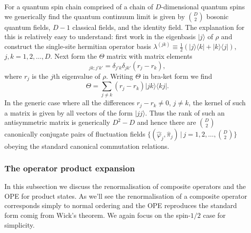 \documentclass[prl,twocolumn,lengthcheck,superscriptaddress]{revtex4-1}
\theoremstyle{definition}
\theoremstyle{remark}
\begin{document}
For a quantum spin chain comprised of a chain of $D$-dimensional quantum spins we generically find the quantum continuum limit is given by $\binom{D}{2}$ bosonic quantum fields, $D-1$ classical fields, and the identity field. The explanation for this is relatively easy to understand: first work in the eigenbasis $|j\rangle$ of $\rho$ and construct the single-site hermitian operator basis $\lambda^{(jk)} \equiv \frac12(|j\rangle\langle k|+|k\rangle\langle j|)$, $j,k = 1, 2, \ldots, D$. Next form the $\Theta$ matrix with matrix elements 
\begin{equation}
	[\Theta]_{jk;j'k'} = \delta_{j'k}\delta_{jk'}( r_j - r_k),
\end{equation}
where $r_j$ is the $j$th eigenvalue of $\rho$. Writing $\Theta$ in bra-ket form we find 
\begin{equation}
	\Theta  = \sum_{j\not= k} (r_j-r_k) |jk\rangle\langle kj|.
\end{equation}
In the generic case where all the differences $r_j-r_k \not=0$, $j\not=k$, the kernel of such a matrix is given by all vectors of the form $|jj\rangle$. Thus the rank of such an antisymmetric matrix is generically $D^2-D$ and hence there are $\binom{D}{2}$ canonically conjugate pairs of fluctuation fields $\{(\widehat{\varphi}_j, \widehat{\pi}_j)\,|\, j= 1, 2, \ldots, \binom{D}{2}\}$ obeying the standard canonical commutation relations. 

\subsubsection{The operator product expansion}
In this subsection we discuss the renormalisation of composite operators and the OPE for product states. As we'll see the renormalisation of a composite operator corresponds simply to normal ordering and the OPE reproduces the standard form comig from Wick's theorem. We again focus on the spin-$1/2$ case for simplicity.
\end{document}
